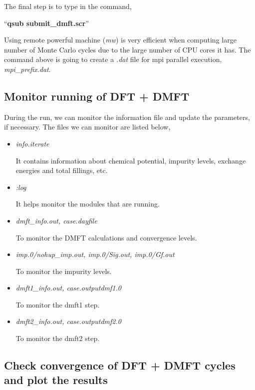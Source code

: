 \documentclass[12 pt]{article}
\begin{document}
  The final step is to type in the command,

  ``\textbf{qsub submit\_dmft.scr}''

  Using remote powerful machine (\emph{mw}) is very efficient when computing large number of Monte Carlo cycles due 
to the large number of CPU cores it has. The command above is going to create a \emph{.dat} file for mpi parallel 
execution, \emph{mpi\_prefix.dat}. 

  \cleardoublepage
     
      \subsection{Monitor running of DFT + DMFT}

  During the run, we can monitor the information file and update the parameters, if necessary. The files we can 
monitor are listed below,

	\begin{itemize}

	 \item \emph{info.iterate}

  It contains information about chemical potential, impurity levels, exchange energies and total fillings, etc. 

	\item \emph{:log}

  It helps monitor the modules that are running.

	\item \emph{dmft\_info.out, case.dayfile}

  To monitor the DMFT calculations and convergence levels.

	\item \emph{imp.0/nohup\_imp.out, imp.0/Sig.out, imp.0/Gf.out}

  To monitor the impurity levels. 

	\item \emph{dmft1\_info.out, case.outputdmf1.0}

  To monitor the dmft1 step. 

	\item \emph{dmft2\_info.out, case.outputdmf2.0}

  To monitor the dmft2 step.

	\end{itemize}

      \subsection{Check convergence of DFT + DMFT cycles and plot the results}
\end{document}
